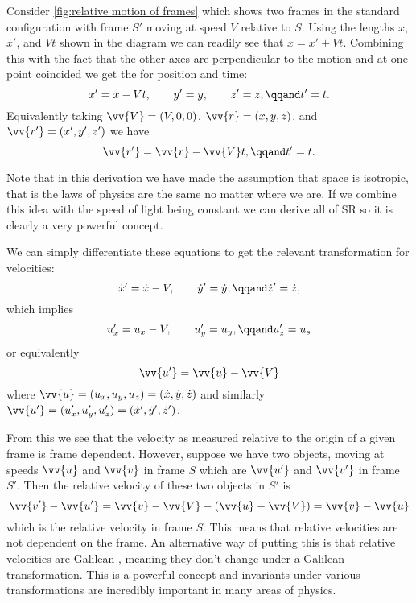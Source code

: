     Consider \cref{fig:relative motion of frames} which shows two frames in the standard configuration with frame \(S'\) moving at speed \(V\) relative to \(S\).
    Using the lengths \(x\), \(x'\), and \(Vt\) shown in the diagram we can readily see that \(x = x' + Vt\).
    Combining this with the fact that the other axes are perpendicular to the motion and at one point coincided we get the  for position and time:
    \begin{equation}
        x' = x - Vt, \qquad y' = y, \qquad z' = z, \qqand t' = t.
    \end{equation}
    Equivalently taking \(\vv{V} = (V, 0, 0)\), \(\vv{r} = (x, y, z)\), and \(\vv{r'} = (x', y', z')\) we have
    \begin{equation}
        \vv{r'} = \vv{r} - \vv{V}t, \qqand t' = t.
    \end{equation}

    Note that in this derivation we have made the assumption that space is isotropic, that is the laws of physics are the same no matter where we are.
    If we combine this idea with the speed of light being constant we can derive all of SR so it is clearly a very powerful concept.
    
    We can simply differentiate these equations to get the relevant transformation for velocities:
    \begin{equation}
        \dot{x}' = \dot{x} - V, \qquad \dot{y}' = \dot{y}, \qqand \dot{z}' = \dot{z},
    \end{equation}
    which implies
    \begin{equation}
        u_x' = u_x - V, \qquad u_y' = u_y, \qqand u_z' = u_s
    \end{equation}
    or equivalently
    \begin{equation}
        \vv{u'} = \vv{u} - \vv{V}
    \end{equation}
    where \(\vv{u} = (u_x, u_y, u_z) = (\dot{x}, \dot{y}, \dot{z})\) and similarly \(\vv{u'} = (u_x', u_y', u_z') = (\dot{x}', \dot{y}', \dot{z}')\).
    
    From this we see that the velocity as measured relative to the origin of a given frame is frame dependent.
    However, suppose we have two objects, moving at speeds \(\vv{u}\) and \(\vv{v}\) in frame \(S\) which are \(\vv{u'}\) and \(\vv{v'}\) in frame \(S'\).
    Then the relative velocity of these two objects in \(S'\) is
    \begin{equation}
        \vv{v'} - \vv{u'} = \vv{v} - \vv{V} - (\vv{u} - \vv{V}) = \vv{v} - \vv{u}
    \end{equation}
    which is the relative velocity in frame \(S\).
    This means that relative velocities are not dependent on the frame.
    An alternative way of putting this is that relative velocities are Galilean , meaning they don't change under a Galilean transformation.
    This is a powerful concept and invariants under various transformations are incredibly important in many areas of physics.
    
